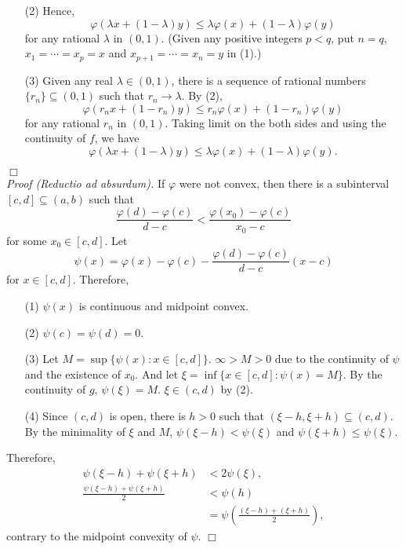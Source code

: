 \documentclass{article}
\begin{document}
\begin{enumerate}
\item[(2)]
Hence,
$$\varphi(\lambda x + (1 - \lambda) y) \leq \lambda \varphi(x) + (1 - \lambda) \varphi(y)$$
for any rational $\lambda$ in $(0,1)$.
(Given any positive integers $p < q$,
put $n = q$,
$x_1 = \cdots = x_p = x$
and $x_{p+1} = \cdots = x_n = y$ in (1).)
\item[(3)]
Given any real $\lambda \in (0,1)$,
there is a sequence of rational numbers $\{r_n\} \subseteq (0, 1)$
such that $r_n \to \lambda$.
By (2),
$$\varphi(r_n x + (1 - r_n) y) \leq r_n \varphi(x) + (1 - r_n) \varphi(y)$$
for any rational $r_n$ in $(0,1)$.
Taking limit on the both sides and using the continuity of $f$,
we have
$$\varphi(\lambda x + (1 - \lambda) y) \leq \lambda \varphi(x) + (1 - \lambda) \varphi(y).$$
\end{enumerate}
$\Box$ \\

\emph{Proof (Reductio ad absurdum).}
If $\varphi$ were not convex,
then there is a subinterval $[c,d] \subseteq (a,b)$
such that
$$\frac{\varphi(d)-\varphi(c)}{d-c} < \frac{\varphi(x_0)-\varphi(c)}{x_0-c}$$
for some $x_0 \in [c, d]$.
Let
$$\psi(x) = \varphi(x)-\varphi(c) - \frac{\varphi(d)-\varphi(c)}{d-c}(x - c)$$
for $x \in [c,d]$.
Therefore,
\begin{enumerate}
\item[(1)]
$\psi(x)$ is continuous and midpoint convex.
\item[(2)]
$\psi(c) = \psi(d) = 0$.
\item[(3)]
Let $M = \sup\{\psi(x) : x \in [c,d]\}$.
$\infty > M > 0$ due to the continuity of $\psi$ and the existence of $x_0$.
And let $\xi = \inf \{ x \in [c,d] : \psi(x) = M \}$.
By the continuity of $g$, $\psi(\xi) = M$.
$\xi \in (c,d)$ by (2).
\item[(4)]
Since $(c,d)$ is open, there is $h > 0$ such that $(\xi-h,\xi+h) \subseteq (c,d)$.
By the minimality of $\xi$ and $M$, $\psi(\xi-h) < \psi(\xi)$ and $\psi(\xi+h) \leq \psi(\xi)$.
\end{enumerate}
Therefore,
\begin{align*}
\psi(\xi-h) + \psi(\xi+h)
&< 2 \psi(\xi), \\
\frac{\psi(\xi-h) + \psi(\xi+h)}{2}
&< \psi(h) \\
&= \psi\left( \frac{(\xi-h) + (\xi+h)}{2} \right),
\end{align*}
contrary to the midpoint convexity of $\psi$.
$\Box$ \\\\



\end{document}
